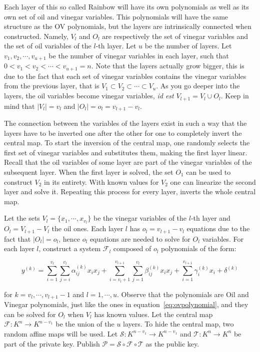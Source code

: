 \documentclass{ufsctex/ufsctex}
\begin{document}
Each layer of this so called Rainbow will have its own polynomials as well as
its own set of oil and vinegar variables. This polynomials will have the same
structure as the OV polynomials, but the layers are intrinsically connected
when constructed. Namely, $V_l$ and $O_l$ are respectively the set of vinegar
variables and the set of oil variables of the $l$-th layer. Let $u$ be the
number of layers. Let $v_1, v_2, \cdots, v_{u+1}$ be the number of vinegar
variables in each layer, such that $0 < v_1 < v_2 < \cdots < v_{u+1} = n$. Note
that the layers actually grow bigger, this is due to the fact that each set of
vinegar variables contains the vinegar variables from the previous layer, that
is $V_1 \subset V_2 \subset \cdots \subset V_{u}$. As you go deeper into the
layers, the oil variables become vinegar variables, \textit{id est} $V_{l+1} =
V_l \cup O_l$. Keep in mind that $|V_l| = v_l$ and $|O_l| = o_l = v_{l+1} -
v_{l}$.

The connection between the variables of the layers exist in such a way that the
layers have to be inverted one after the other for one to completely invert the
central map. To start the inversion of the central map, one randomly selects
the first set of vinegar variables and substitutes them, making the first layer
linear. Recall that the oil variables of some layer are part of the vinegar
variables of the subsequent layer. When the first layer is solved, the set
$O_1$ can be used to construct $V_2$ in its entirety. With known values for
$V_2$ one can linearize the second layer and solve it. Repeating this process
for every layer, inverts the whole central map.

Let the sets $V_l = \{x_1, \cdots, x_{v_l}\}$ be the vinegar variables of the
$l$-th layer and $O_l = V_{l+1} - V_l$ the oil ones. Each layer $l$ has $o_l =
v_{l+1} - v_{l}$ equations due to the fact that $|O_l| = o_l$, hence $o_l$
equations are needed to solve for $O_l$ variables. For each layer $l$,
construct a system $\mathcal{F}_l$ composed of $o_l$ polynomials of the form:

\begin{equation}
y^{(k)} =
\sum_{i=1}^{v_l}\sum_{j=i}^{v_l} \alpha^{(k)}_{ij} x_i x_j +
\sum_{i=v_l+1}^{v_{l+1}}\sum_{j=1}^{v_l} \beta^{(k)}_{ij} x_i x_j +
\sum_{i=1}^{v_{l+1}} \gamma^{(k)}_{i} x_i +
\delta^{(k)}
\end{equation}

for $k = v_l, \cdots, v_{l+1} - 1$ and $l = 1, \cdots, u$. Observe that the
polynomials are Oil and Vinegar polynomials, just like the ones in
equation~\ref{eq:ovpolynomial}, and they can be solved for $O_l$ when $V_l$ has
known values. Let the central map $\mathcal{F}:K^{n} \to K^{n-v_1}$ be the
union of the $u$ layers. To hide the central map, two random affine maps will
be used. Let $\mathcal{S}:K^{n-v_1} \to K^{n-v_1}$ and $\mathcal{T}:K^{n} \to
K^{n}$ be part of the private key. Publish $\mathcal{P} = \mathcal{S} \circ
\mathcal{F} \circ \mathcal{T}$ as the public key.
\end{document}
